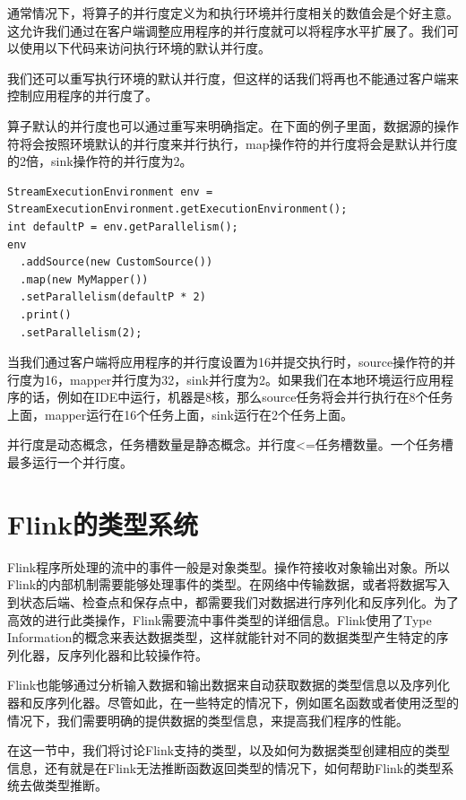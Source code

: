 \documentclass[cn,11pt,chinese]{elegantbook}
\begin{document}
通常情况下，将算子的并行度定义为和执行环境并行度相关的数值会是个好主意。这允许我们通过在客户端调整应用程序的并行度就可以将程序水平扩展了。我们可以使用以下代码来访问执行环境的默认并行度。

我们还可以重写执行环境的默认并行度，但这样的话我们将再也不能通过客户端来控制应用程序的并行度了。

算子默认的并行度也可以通过重写来明确指定。在下面的例子里面，数据源的操作符将会按照环境默认的并行度来并行执行，map操作符的并行度将会是默认并行度的2倍，sink操作符的并行度为2。

\begin{verbatim}
StreamExecutionEnvironment env = StreamExecutionEnvironment.getExecutionEnvironment();
int defaultP = env.getParallelism();
env
  .addSource(new CustomSource())
  .map(new MyMapper())
  .setParallelism(defaultP * 2)
  .print()
  .setParallelism(2);
\end{verbatim}

当我们通过客户端将应用程序的并行度设置为16并提交执行时，source操作符的并行度为16，mapper并行度为32，sink并行度为2。如果我们在本地环境运行应用程序的话，例如在IDE中运行，机器是8核，那么source任务将会并行执行在8个任务上面，mapper运行在16个任务上面，sink运行在2个任务上面。

\begin{note}
    并行度是动态概念，任务槽数量是静态概念。并行度<=任务槽数量。一个任务槽最多运行一个并行度。
\end{note}

\section{Flink的类型系统}

Flink程序所处理的流中的事件一般是对象类型。操作符接收对象输出对象。所以Flink的内部机制需要能够处理事件的类型。在网络中传输数据，或者将数据写入到状态后端、检查点和保存点中，都需要我们对数据进行序列化和反序列化。为了高效的进行此类操作，Flink需要流中事件类型的详细信息。Flink使用了Type Information的概念来表达数据类型，这样就能针对不同的数据类型产生特定的序列化器，反序列化器和比较操作符。

Flink也能够通过分析输入数据和输出数据来自动获取数据的类型信息以及序列化器和反序列化器。尽管如此，在一些特定的情况下，例如匿名函数或者使用泛型的情况下，我们需要明确的提供数据的类型信息，来提高我们程序的性能。

在这一节中，我们将讨论Flink支持的类型，以及如何为数据类型创建相应的类型信息，还有就是在Flink无法推断函数返回类型的情况下，如何帮助Flink的类型系统去做类型推断。
\end{document}
